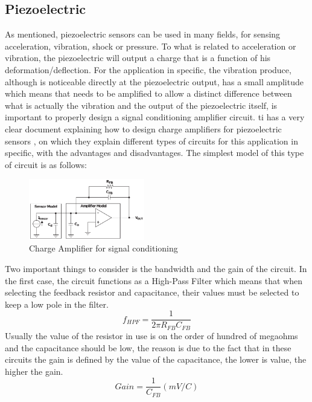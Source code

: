 \subsection{Piezoelectric}
As mentioned, piezoelectric sensors can be used in many fields, for sensing acceleration, vibration, shock or pressure. To what is related to acceleration or vibration, the piezoelectric will output a charge that is a function of his deformation/deflection. For the application in specific, the vibration produce, although is noticeable directly at the piezoelectric output, has a small amplitude which means that needs to be amplified to allow a distinct difference between what is actually the vibration and the output of the piezoelectric itself, is important to properly design a signal conditioning amplifier circuit. \acrlong{ti} has a very clear document explaining how to design charge amplifiers for piezoelectric sensors \cite{bartolomeSignalConditioningPiezoelectric2010}, on which they explain different types of circuits for this application in specific, with the advantages and disadvantages. The simplest model of this type of circuit is as follows: 
\begin{figure}[]
    \centering
    \includegraphics[width=0.45\textwidth]{Chapters/4CHP/Figures/singleenddedchargeamp.pdf}
    \caption{Charge Amplifier for signal conditioning}
    \label{fig:ChargeAmpSimp}
\end{figure}
Two important things to consider is the bandwidth and the gain of the circuit. In the first case, the circuit functions as a High-Pass Filter which means that when selecting the feedback resistor and capacitance, their values must be selected to keep a low pole in the filter.
\begin{equation}\label{eq:fhpf}
    f_{HPF} = \frac{1}{2\pi R_{FB}C_{FB}}
\end{equation}
Usually the value of the resistor in use is on the order of hundred of megaohms and the capacitance should be low, the reason is due to the fact that in these circuits the gain is defined by the value of the capacitance, the lower is value, the higher the gain.
\begin{equation}
    Gain = \frac{1}{C_{FB}} (mV/C)
\end{equation}
